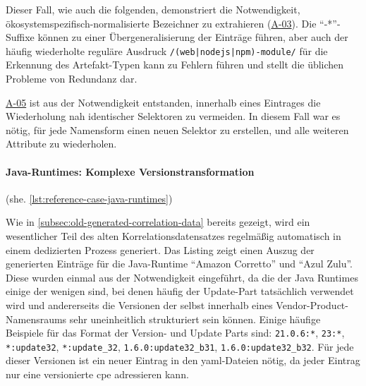 Dieser Fall, wie auch die folgenden, demonstriert die Notwendigkeit, ökosystemspezifisch-normalisierte Bezeichner zu extrahieren (\hyperref[subsec:req-type-specific-matching]{A-03}).
Die \enquote{-*}-Suffixe können zu einer Übergeneralisierung der Einträge führen, aber auch der häufig wiederholte reguläre Ausdruck \texttt{/(web|nodejs|npm)-module/} für die Erkennung des Artefakt-Typen kann zu Fehlern führen und stellt die üblichen Probleme von Redundanz dar.

\hyperref[subsec:req-multiple-attribute-values]{A-05} ist aus der Notwendigkeit entstanden, innerhalb eines Eintrages die Wiederholung nah identischer Selektoren zu vermeiden.
In diesem Fall war es nötig, für jede Namensform einen neuen Selektor zu erstellen, und alle weiteren Attribute zu wiederholen.

\paragraph{Java-Runtimes: Komplexe Versionstransformation}\label{par:reference-case-java-runtimes} (she. \autoref{lst:reference-case-java-runtimes})

Wie in \autoref{subsec:old-generated-correlation-data} bereits gezeigt, wird ein wesentlicher Teil des alten Korrelationsdatensatzes regelmäßig automatisch in einem dedizierten Prozess generiert.
Das Listing zeigt einen Auszug der generierten Einträge für die Java-Runtime \enquote{Amazon Corretto} und \enquote{Azul Zulu}.
Diese wurden einmal aus der Notwendigkeit eingeführt, da die  der Java Runtimes einige der wenigen sind, bei denen häufig der Update-Part tatsächlich verwendet wird und andererseits die Versionen der  selbst innerhalb eines Vendor-Product-Namensraums sehr uneinheitlich strukturiert sein können.
Einige häufige Beispiele für das Format der Version- und Update Parts sind: \texttt{21.0.6:*}, \texttt{23:*}, \texttt{*:update32}, \texttt{*:update\_32}, \texttt{1.6.0:update32\_b31}, \texttt{1.6.0:update32\_b32}.
Für jede dieser Versionen ist ein neuer Eintrag in den \acrshort{yaml}-Dateien nötig, da jeder Eintrag nur eine versionierte \acrshort{cpe} adressieren kann.

